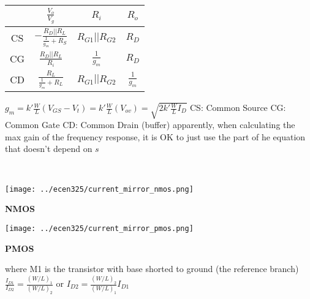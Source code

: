 \documentclass[12pt]{article}
\begin{document}
\begin{spacing}{0.8}
\begin{multicols*}{2}
\begin{flushleft}
\begin{outline}[longenum]
\\
{\def\arraystretch{3}
  \begin{tabular}{|c|c|c|c|} \hline
  & $\frac{V_o}{V_g}$ & $R_i$ & $R_o$ \\ \hline
  \vspace{4px} CS & $-\frac{R_D||R_L}{\frac{1}{g_m}+R_S}$ & $R_{G1}||R_{G2}$ & $R_D$           \\ \hline
  \vspace{4px} CG & $\frac{R_D||R_L}{R_i}$                & $\frac{1}{g_m}$  & $R_D$           \\ \hline
  \vspace{4px} CD & $\frac{R_L}{\frac{1}{g_m}+R_L}$       & $R_{G1}||R_{G2}$ & $\frac{1}{g_m}$ \\ \hline
  \end{tabular}
}

  \1 $g_m
    = k' \frac{W}{L}(V_{GS}-V_t)
    = k' \frac{W}{L}(V_{ov})
    = \sqrt{ 2 k' \frac{W}{L} I_D }
    $
  \1 CS: Common Source
  \1 CG: Common Gate
  \1 CD: Common Drain (buffer)
  \1 apparently, when calculating the max gain of the frequency response, it is OK to just use the part of he equation that doesn't depend on $s$

\\
\begin{minipage}{0.49\columnwidth}
\texttt{[image: ../ecen325/current\_mirror\_nmos.png]}
\begin{center}
\vspace{-10px}
\textbf{NMOS}
\end{center}
\end{minipage}
\begin{minipage}{0.49\columnwidth}
\texttt{[image: ../ecen325/current\_mirror\_pmos.png]}
\begin{center}
\vspace{-10px}
\textbf{PMOS}
\end{center}
\end{minipage}
  \1 where M1 is the transistor with base shorted to ground (the reference branch)
  \1 $\frac{I_{D1}}{I_{D2}}=\frac{(W/L)_1}{(W/L)_2}$
    or $I_{D2} = \frac{(W/L)_2}{(W/L)_1} I_{D1}$



\end{outline}
\end{flushleft}
\end{multicols*}
\end{spacing}
\end{document}
